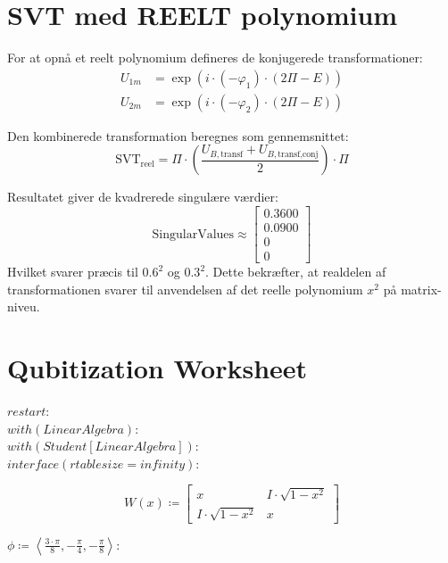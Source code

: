 \documentclass[11pt,a4paper]{article}
\begin{document}
\section{SVT med REELT polynomium}
For at opnå et reelt polynomium defineres de konjugerede transformationer:
\begin{align}
U_{1m} &= \exp(i \cdot (-\varphi_1) \cdot (2\Pi - E)) \\
U_{2m} &= \exp(i \cdot (-\varphi_2) \cdot (2\Pi - E))
\end{align}

Den kombinerede transformation beregnes som gennemsnittet:
\begin{equation}
\text{SVT}_{\text{reel}} = \Pi \cdot \left( \frac{U_{B,\text{transf}} + U_{B,\text{transf,conj}}}{2} \right) \cdot \Pi
\end{equation}

Resultatet giver de kvadrerede singulære værdier:
\begin{equation}
\text{SingularValues} \approx \begin{bmatrix} 0.3600 \\ 0.0900 \\ 0 \\ 0 \end{bmatrix}
\end{equation}
Hvilket svarer præcis til $0.6^2$ og $0.3^2$. Dette bekræfter, at realdelen af transformationen svarer til anvendelsen af det reelle polynomium $x^2$ på matrix-niveu.



\section*{Qubitization Worksheet}

$restart :$ \\
$with(LinearAlgebra) :$ \\
$with(Student[LinearAlgebra]) :$ \\
$interface(rtablesize = infinity) :$

\begin{equation}
W(x) \coloneqq \begin{bmatrix} x & I \cdot \sqrt{1-x^2} \\ I \cdot \sqrt{1-x^2} & x \end{bmatrix}
\end{equation}

$\phi \coloneqq \left\langle \frac{3 \cdot \pi}{8}, -\frac{\pi}{4}, -\frac{\pi}{8} \right\rangle :$
\end{document}

